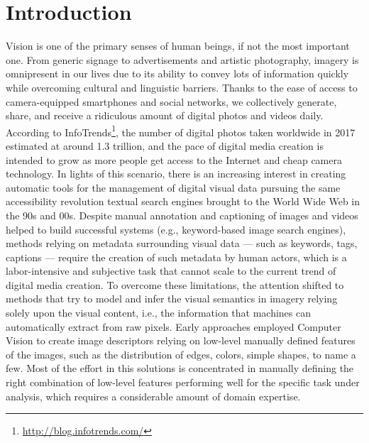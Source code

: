 
\chapter{Introduction}
\label{ch:introduction}

Vision is one of the primary senses of human beings, if not the most important one.
From generic signage to advertisements and artistic photography, imagery is omnipresent in our lives due to its ability to convey lots of information quickly while overcoming cultural and linguistic barriers.
Thanks to the ease of access to camera-equipped smartphones and social networks, we collectively generate, share, and receive a ridiculous amount of digital photos and videos daily.
According to InfoTrends\footnote{\url{http://blog.infotrends.com/}}, the number of digital photos taken worldwide in 2017 estimated at around 1.3 trillion, and the pace of digital media creation is intended to grow as more people get access to the Internet and cheap camera technology.
In lights of this scenario, there is an increasing interest in creating automatic tools for the management of digital visual data pursuing the same accessibility revolution textual search engines brought to the World Wide Web in the 90s and 00s.
Despite manual annotation and captioning of images and videos helped to build successful systems (e.g., keyword-based image search engines), methods relying on metadata surrounding visual data --- such as keywords, tags, captions --- require the creation of such metadata by human actors, which is a labor-intensive and subjective task that cannot scale to the current trend of digital media creation.
To overcome these limitations, the attention shifted to methods that try to model and infer the visual semantics in imagery relying solely upon the visual content, i.e., the information that machines can automatically extract from raw pixels.
Early approaches employed Computer Vision to create image descriptors relying on low-level manually defined features of the images, such as the distribution of edges, colors, simple shapes, to name a few.
Most of the effort in this solutions is concentrated in manually defining the right combination of low-level features performing well for the specific task under analysis, which requires a considerable amount of domain expertise.

